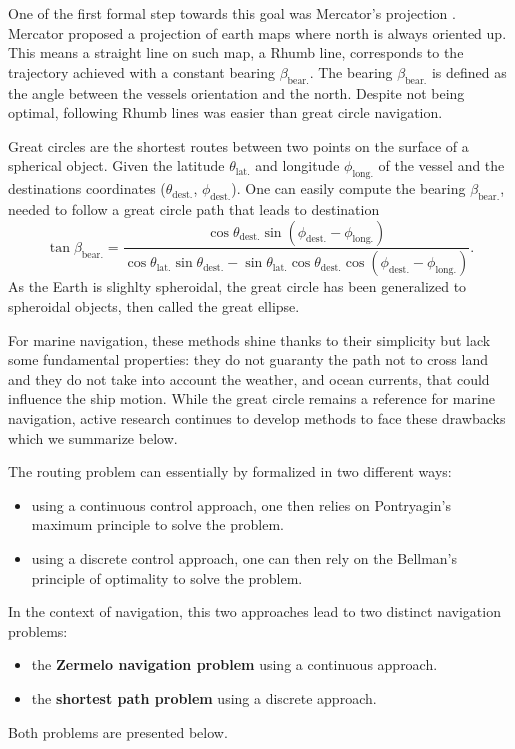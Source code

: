 One of the first formal step towards this goal was Mercator's projection \citep{snyder1997flattening}.
Mercator proposed a projection of earth maps where north is always oriented up.
This means a straight line on such map, a Rhumb line, corresponds to the trajectory achieved with a constant bearing $\beta_{\mathrm{bear.}}$.
The bearing $\beta_{\mathrm{bear.}}$ is defined as the angle between the vessels orientation and the north.
Despite not being optimal, following Rhumb lines was easier than great circle navigation.

Great circles are the shortest routes between two points on the surface of a spherical object.
Given the latitude $\theta_{\mathrm{lat.}}$ and longitude $\phi_{\mathrm{long.}}$ of the vessel and the destinations coordinates ($\theta_{\mathrm{dest.}}$, $\phi_{\mathrm{dest.}}$).
One can easily compute the bearing $\beta_{\mathrm{bear.}}$, needed to follow a great circle path that leads to destination
\begin{equation}
	\tan \beta_{\mathrm{bear.}} = \frac{\cos \theta_{\mathrm{dest.}} \sin \left(\phi_{\mathrm{dest.}} - \phi_{\mathrm{long.}}\right)}{\cos \theta_{\mathrm{lat.}} \sin \theta_{\mathrm{dest.}} - \sin \theta_{\mathrm{lat.}} \cos \theta_{\mathrm{dest.}} \cos \left(\phi_{\mathrm{dest.}} - \phi_{\mathrm{long.}} \right)}.
\end{equation}
As the Earth is slighlty spheroidal, the great circle has been generalized to spheroidal objects, then called the great ellipse.

For marine navigation, these methods shine thanks to their simplicity but lack some fundamental properties: they do not guaranty the path not to cross land and they do not take into account the weather, and ocean currents, that could influence the ship motion.
While the great circle remains a reference for marine navigation, active research continues to develop methods to face these drawbacks which we summarize below.

The routing problem can essentially by formalized in two different ways:
\begin{itemize}
	\item using a continuous control approach, one then relies on Pontryagin's maximum principle to solve the problem.
	\item using a discrete control approach, one can then rely on the Bellman's principle of optimality to solve the problem.
\end{itemize}
In the context of navigation, this two approaches lead to two distinct navigation problems:
\begin{itemize}
	\item the \textbf{Zermelo navigation problem} using a continuous approach.
	\item the \textbf{shortest path problem} using a discrete approach.
\end{itemize}
Both problems are presented below.

